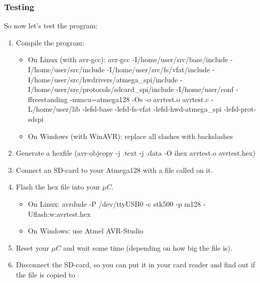 \subsubsection{Testing}
So now let's test the program:
\begin{enumerate}
	\item
	{	Compile the program:
		\begin{itemize}
			\item{On Linux (with avr-gcc): avr-gcc -I/home/user/src/base/include -I/home/user/src/include -I/home/user/src/fs/vfat/include -I/home/user/src/hwdrivers/atmega\_spi/include -I/home/user/src/protocols/sdcard\_spi/include -I/home/user/conf -ffreestanding -mmcu=atmega128 -Os -o avrtest.o avrtest.c -L/home/user/lib -lefsl-base -lefsl-fs-vfat -lefsl-hwd-atmega\_spi -lefsl-prot-sdspi}
			\item{On Windows (with WinAVR): replace all slashes with backslashes} 
		\end{itemize}
	}
	\item{Generate a hexfile 
		(avr-objcopy -j .text -j .data -O ihex avrtest.o avrtest.hex)}
	\item{Connect an SD-card to your Atmega128 with a file called 
		 on it.}
	\item
	{
		Flash the hex file into your $\mu C$.
		\begin{itemize}
			\item{On Linux: avrdude -P /dev/ttyUSB0 -c stk500 -p m128 -Uflash:w:avrtest.hex}
			\item{On Windows: use Atmel AVR-Studio}
		\end{itemize}
	}
	\item{Reset your $\mu C$ and wait some time (depending on how big
		the file  is).}
	\item{Disconnect the SD-card, so you can put it in your card reader
		and find out if the file  is copied to 
		.}
\end{enumerate}
